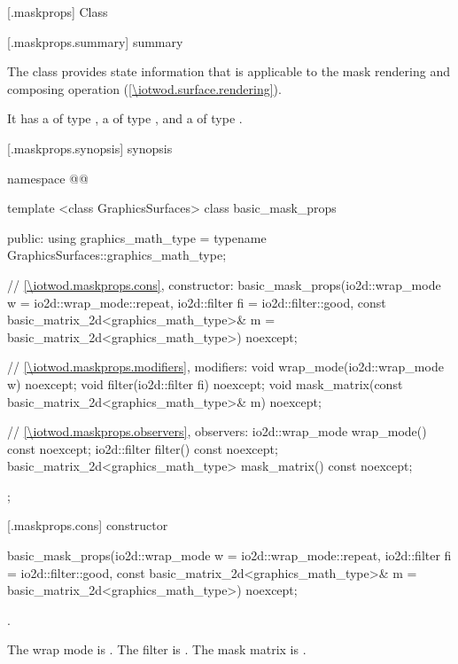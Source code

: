 
 [\iotwod.maskprops] {Class }

 [\iotwod.maskprops.summary] { summary}

\pnum
The  class provides state information that is applicable to the mask rendering and composing operation (\ref{\iotwod.surface.rendering}).

\pnum
It has a  of type , a  of type , and a  of type .

 [\iotwod.maskprops.synopsis] { synopsis}

\begin{codeblock}
namespace @\fullnamespace{}@ {
  template <class GraphicsSurfaces>
  class basic_mask_props {
    public:
    using graphics_math_type = typename GraphicsSurfaces::graphics_math_type;

    // \ref{\iotwod.maskprops.cons}, constructor:
    basic_mask_props(io2d::wrap_mode w = io2d::wrap_mode::repeat,
      io2d::filter fi = io2d::filter::good,
      const basic_matrix_2d<graphics_math_type>& m = basic_matrix_2d<graphics_math_type>{})
      noexcept;

    // \ref{\iotwod.maskprops.modifiers}, modifiers:
    void wrap_mode(io2d::wrap_mode w) noexcept;
    void filter(io2d::filter fi) noexcept;
    void mask_matrix(const basic_matrix_2d<graphics_math_type>& m) noexcept;

    // \ref{\iotwod.maskprops.observers}, observers:
    io2d::wrap_mode wrap_mode() const noexcept;
    io2d::filter filter() const noexcept;
    basic_matrix_2d<graphics_math_type> mask_matrix() const noexcept;
  };
}
\end{codeblock}

 [\iotwod.maskprops.cons] { constructor}

%
\begin{itemdecl}
basic_mask_props(io2d::wrap_mode w = io2d::wrap_mode::repeat,
  io2d::filter fi = io2d::filter::good,
  const basic_matrix_2d<graphics_math_type>& m = basic_matrix_2d<graphics_math_type>{}) noexcept;
\end{itemdecl}
\begin{itemdescr}
\requires
{}.

\pnum
\effects
The wrap mode is . The filter is . The mask matrix is .
\end{itemdescr}

